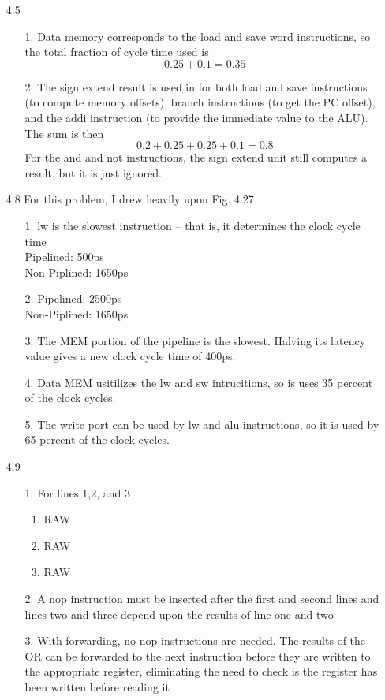 \documentclass[]{3330hw}
\begin{document}
\maketitle

\begin{enumerate}

\item [4.5]
\begin{enumerate}
	\item [1.] Data memory corresponds to the load and save word instructions, so the total fraction of cycle time used is \[0.25 + 0.1 = 0.35\]
	\item [2.] The sign extend result is used in for both load and save instructions (to compute memory offsets), branch instructions (to get the PC offset), and the addi instruction (to provide the immediate value to the ALU). The sum  is then \[0.2 + 0.25 + 0.25 + 0.1 = 0.8\] For the and and not instructions, the sign extend unit still computes a result, but it is just ignored.
\end{enumerate}

\item [4.8] For this problem, I drew heavily upon Fig. 4.27 
\begin{enumerate}
    \item [1.] lw is the slowest instruction -- that is, it determines the clock cycle time\\
	Pipelined: 500ps \\
	Non-Piplined: 1650ps
	\item [2.]
	Pipelined: 2500ps \\
	Non-Piplined: 1650ps
	\item [3.] The MEM portion of the pipeline is the slowest. Halving its latency value gives a new clock cycle time of 400ps.
	\item [4.] Data MEM usitilizes the lw and sw intrucitions, so is uses 35 percent of the clock cycles.
	\item [5.] The write port can be used by lw and alu instructions, so it is used by 65 percent of the clock cycles.
\end{enumerate}
 
\item [4.9]
\begin{enumerate}
    \item [1.] For lines 1,2, and 3
	\begin{enumerate}
	    \item RAW
		\item RAW
		\item RAW
	\end{enumerate}
	\item [2.] A nop instruction must be inserted after the first and second lines and lines two and three depend upon the results of line one and two
	\item [3.] With forwarding, no nop instructions are needed. The results of the OR can be forwarded to the next instruction before they are written to the appropriate register, eliminating the need to check is the register has been written before reading it
	\end{enumerate}


\end{enumerate}
\end{document}
